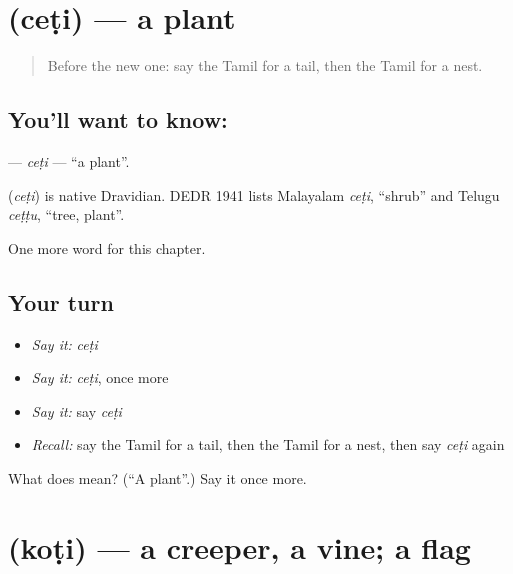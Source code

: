 \section[\texorpdfstring{\ta{செடி} (ceṭi)}{செடி (ceṭi)}]{ (ceṭi) — a plant}

\label{lesson:TA-C275-ceti}



\begin{quote}
Before the new one: say the Tamil for a tail, then the Tamil for a nest.
\end{quote}

\subsection*{You'll want to know: }
\textbf{} — \emph{ceṭi} — \textquotedblleft{}a plant\textquotedblright{}.

\begin{cousinweb}
\textbf{} (\emph{ceṭi}) is native Dravidian. DEDR 1941 lists Malayalam \emph{ceṭi}, \textquotedblleft{}shrub\textquotedblright{} and Telugu \emph{ceṭṭu}, \textquotedblleft{}tree, plant\textquotedblright{}.
\end{cousinweb}

\begin{grammarlens}[title={What you've built}]
One more word for this chapter.
\end{grammarlens}

\subsection*{Your turn}
\begin{itemize}
\raggedright
  \item \emph{Say it:} \emph{ceṭi}
  \item \emph{Say it:} \emph{ceṭi}, once more
  \item \emph{Say it:} say \emph{ceṭi}
  \item \emph{Recall:} say the Tamil for a tail, then the Tamil for a nest, then say \emph{ceṭi} again
\end{itemize}

\begin{tcolorbox}[breakable,colback=teal!4,colframe=teal!35!black,title={Before you move on}]
What does  mean? (\textquotedblleft{}A plant\textquotedblright{}.) Say it once more.
\end{tcolorbox}
\section[\texorpdfstring{\ta{கொடி} (koṭi)}{கொடி (koṭi)}]{ (koṭi) — a creeper, a vine; a flag}

